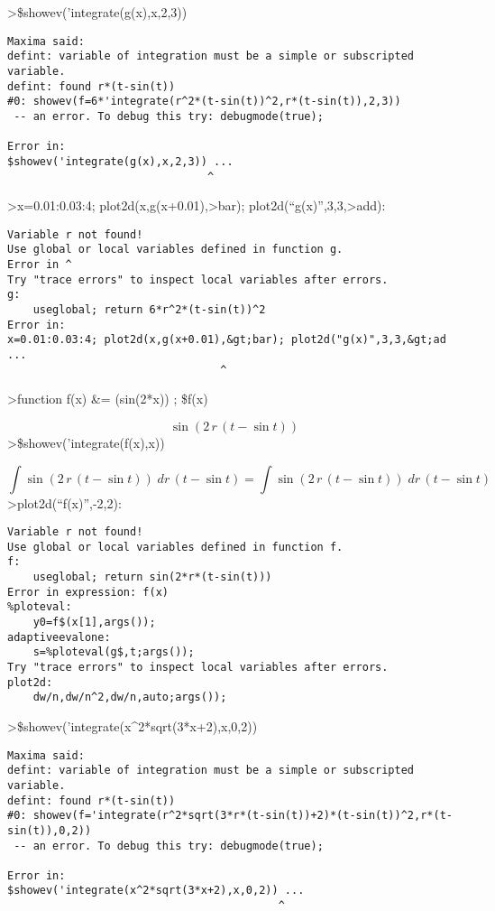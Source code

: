 \documentclass[
]{book}
\begin{document}
\textgreater\$showev('integrate(g(x),x,2,3))

\begin{verbatim}
Maxima said:
defint: variable of integration must be a simple or subscripted variable.
defint: found r*(t-sin(t))
#0: showev(f=6*'integrate(r^2*(t-sin(t))^2,r*(t-sin(t)),2,3))
 -- an error. To debug this try: debugmode(true);

Error in:
$showev('integrate(g(x),x,2,3)) ...
                               ^
\end{verbatim}

\textgreater x=0.01:0.03:4; plot2d(x,g(x+0.01),\textgreater bar); plot2d(``g(x)'',3,3,\textgreater add):

\begin{verbatim}
Variable r not found!
Use global or local variables defined in function g.
Error in ^
Try "trace errors" to inspect local variables after errors.
g:
    useglobal; return 6*r^2*(t-sin(t))^2 
Error in:
x=0.01:0.03:4; plot2d(x,g(x+0.01),&gt;bar); plot2d("g(x)",3,3,&gt;ad ...
                                 ^
\end{verbatim}

\textgreater function f(x) \&= (sin(2*x)) ; \$f(x)

\[\sin \left(2\,r\,\left(t-\sin t\right)\right)\]\textgreater\$showev('integrate(f(x),x))

\[\int {\sin \left(2\,r\,\left(t-\sin t\right)\right)}{\;dr\,\left(t-\sin t\right)}=\int {\sin \left(2\,r\,\left(t-\sin t\right)\right)}{\;dr\,\left(t-\sin t\right)}\]\textgreater plot2d(``f(x)'',-2,2):

\begin{verbatim}
Variable r not found!
Use global or local variables defined in function f.
f:
    useglobal; return sin(2*r*(t-sin(t))) 
Error in expression: f(x)
%ploteval:
    y0=f$(x[1],args());
adaptiveevalone:
    s=%ploteval(g$,t;args());
Try "trace errors" to inspect local variables after errors.
plot2d:
    dw/n,dw/n^2,dw/n,auto;args());
\end{verbatim}

\textgreater\$showev('integrate(x\^{}2*sqrt(3*x+2),x,0,2))

\begin{verbatim}
Maxima said:
defint: variable of integration must be a simple or subscripted variable.
defint: found r*(t-sin(t))
#0: showev(f='integrate(r^2*sqrt(3*r*(t-sin(t))+2)*(t-sin(t))^2,r*(t-sin(t)),0,2))
 -- an error. To debug this try: debugmode(true);

Error in:
$showev('integrate(x^2*sqrt(3*x+2),x,0,2)) ...
                                          ^
\end{verbatim}
\end{document}
